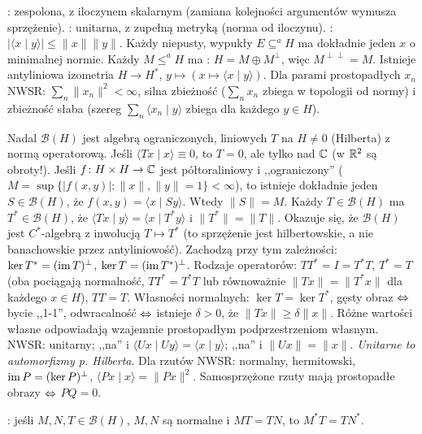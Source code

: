 :  zespolona, z iloczynem skalarnym (zamiana kolejności argumentów wymusza sprzężenie).
: unitarna, z zupełną metryką (norma od iloczynu).
: $|\langle x \mid y \rangle| \le \|x\| \|y\|$.
Każdy niepusty, wypukły $E \subseteq^a H$ ma dokładnie jeden $x$ o minimalnej normie.
Każdy $M \le^a H$ ma : $H = M \oplus M^\perp$, więc $M^{\perp \perp} = M$.
Istnieje antyliniowa izometria $H \to H^*$, $y \mapsto (x \mapsto \langle x \mid y \rangle)$.
Dla parami prostopadłych $x_n$ NWSR: $\sum_n \|x_n\|^2 < \infty$, silna zbieżność ($\sum_n x_n$ zbiega w topologii od normy)  i zbieżność słaba (szereg $\sum_n \langle x_n \mid y \rangle$ zbiega dla każdego $y \in H$).

Nadal $\mathcal B(H)$ jest algebrą ograniczonych, liniowych $T$ na $H \neq 0$ (Hilberta) z normą operatorową.
Jeśli $\langle Tx \mid x \rangle \equiv 0$, to $T = 0$, ale tylko nad $\mathbb{C}$ (w $\mathbb{R}^2$ są obroty!).
Jeśli $f \colon H \times H \to \mathbb{C}$ jest półtoraliniowy i ,,ograniczony'' ($M = \sup\{|f(x,y)| : \|x\|, \|y\| = 1\} < \infty$), to istnieje dokładnie jeden $S \in \mathcal B(H)$, że $f(x,y) = \langle x \mid Sy \rangle$.
Wtedy $\|S\| = M$.
Każdy $T \in \mathcal B(H)$ ma  $T^* \in \mathcal B(H)$, że $\langle Tx \mid y \rangle = \langle x \mid T^*y \rangle$ i $\|T^*\| = \|T\|$.
Okazuje się, że $\mathcal B(H)$ jest $C^*$-algebrą z inwolucją $T \mapsto T^*$ (to sprzężenie jest hilbertowskie, a nie banachowskie przez antyliniowość).
Zachodzą przy tym zależności: $\ker T^* = (\operatorname{im} T)^\perp$, $\ker T = (\operatorname{im} T^*)^\perp$.
Rodzaje operatorów:  $TT^* = I = T^*T$,  $T^* = T$ (oba pociągają normalność, $TT^* = T^*T$ lub równoważnie $\|Tx\| = \|T^*x\|$ dla każdego $x \in H$),  $TT = T$.
Własności normalnych: $\ker T = \ker T^*$, gęsty obraz $\Leftrightarrow$ bycie ,,1-1'', odwracalność $\Leftrightarrow$ istnieje $\delta > 0$, że $\|T x\| \ge \delta \|x\|$.
Różne wartości własne odpowiadają wzajemnie prostopadłym podprzestrzeniom własnym.
NWSR: unitarny; ,,na'' i $\langle Ux \mid Uy \rangle = \langle x \mid y \rangle$; ,,na'' i $\|Ux\| = \|x\|$.
\emph{Unitarne to automorfizmy p. Hilberta}.
Dla rzutów NWSR: normalny, hermitowski, $\operatorname{im} P = (\ker P)^\perp$, $\langle Px \mid x \rangle = \|Px\|^2$.
Samosprzężone rzuty mają prostopadłe obrazy $\Leftrightarrow$ $PQ = 0$.

:  jeśli $M, N, T \in \mathcal B(H)$, $M,N$ są normalne i $MT = TN$, to $M^*T = TN^*$.

